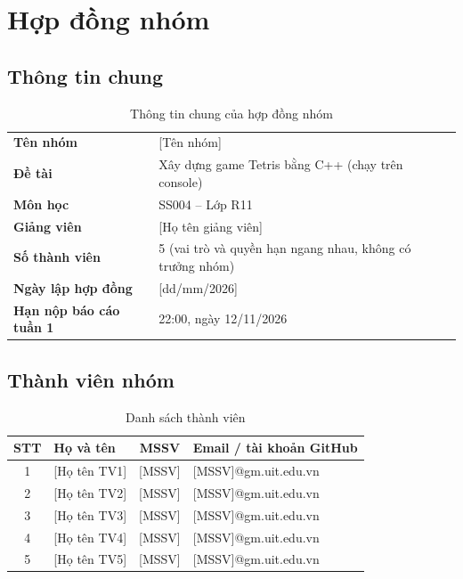 \documentclass[13pt,a4paper]{extarticle}
\makeatletter
\newcommand{\todo}[1]{\textcolor{todored}{[#1]}}
\newcommand{\hl}[1]{\cellcolor{headfill}\textbf{#1}}
\newcommand{\tennhom}{\todo{Tên nhóm}}
\newcommand{\gvien}{\todo{Họ tên giảng viên}}
\newcommand{\ngaylap}{\todo{dd/mm/2026}}
\newcommand{\tvA}{\todo{Họ tên TV1}} \newcommand{\mssvA}{\todo{MSSV}} \newcommand{\mailA}{\todo{MSSV}@gm.uit.edu.vn}
\newcommand{\tvB}{\todo{Họ tên TV2}} \newcommand{\mssvB}{\todo{MSSV}} \newcommand{\mailB}{\todo{MSSV}@gm.uit.edu.vn}
\newcommand{\tvC}{\todo{Họ tên TV3}} \newcommand{\mssvC}{\todo{MSSV}} \newcommand{\mailC}{\todo{MSSV}@gm.uit.edu.vn}
\newcommand{\tvD}{\todo{Họ tên TV4}} \newcommand{\mssvD}{\todo{MSSV}} \newcommand{\mailD}{\todo{MSSV}@gm.uit.edu.vn}
\newcommand{\tvE}{\todo{Họ tên TV5}} \newcommand{\mssvE}{\todo{MSSV}} \newcommand{\mailE}{\todo{MSSV}@gm.uit.edu.vn}
\makeatother
\begin{document}
\setcounter{page}{1}
\tableofcontents
\newpage

\section{Hợp đồng nhóm}

\subsection{Thông tin chung}
\begin{table}[H]
\centering
\begin{tabularx}{\linewidth}{@{}l X@{}}
\toprule
\hl{Tên nhóm} & \tennhom\\
\hl{Đề tài} & Xây dựng game Tetris bằng C++ (chạy trên console)\\
\hl{Môn học} & SS004 -- Lớp R11\\
\hl{Giảng viên} & \gvien\\
\hl{Số thành viên} & 5 (vai trò và quyền hạn ngang nhau, không có trưởng nhóm)\\
\hl{Ngày lập hợp đồng} & \ngaylap\\
\hl{Hạn nộp báo cáo tuần 1} & 22:00, ngày 12/11/2026\\
\bottomrule
\end{tabularx}
\caption{Thông tin chung của hợp đồng nhóm}
\end{table}

\subsection{Thành viên nhóm}
\begin{table}[H]
\centering
\begin{tabularx}{\linewidth}{@{}c X c X@{}}
\toprule
\textbf{STT} & \textbf{Họ và tên} & \textbf{MSSV} & \textbf{Email / tài khoản GitHub}\\
\midrule
1 & \tvA & \mssvA & \mailA\\
2 & \tvB & \mssvB & \mailB\\
3 & \tvC & \mssvC & \mailC\\
4 & \tvD & \mssvD & \mailD\\
5 & \tvE & \mssvE & \mailE\\
\bottomrule
\end{tabularx}
\caption{Danh sách thành viên}
\end{table}
\end{document}

